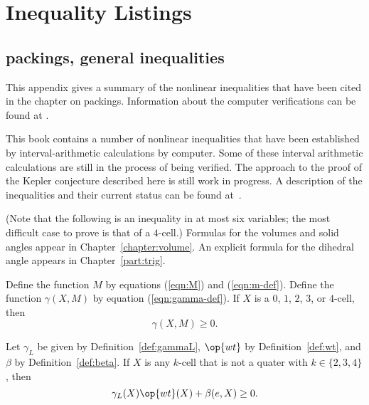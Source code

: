 \clearpage

\section{Inequality Listings}


\subsection{packings, general inequalities}

This appendix gives a summary of the nonlinear inequalities that have
been cited in the chapter on packings.  Information about the computer
verifications can be found at \cite{hales:2009:nonlinear}.


\begin{note}%
This book contains a number of nonlinear inequalities that have been
established by interval-arithmetic calculations by computer.  Some
of these interval arithmetic calculations are still in the process
of being verified.  The approach to the proof of the Kepler
conjecture described here is still work in progress.  A description
of the inequalities and their current status can be found
at~\cite{hales:2009:nonlinear}.
\end{note}


(Note that the following is an inequality in at most six variables; the most
difficult case to prove is that of a $4$-cell.)  Formulas for the
volumes and solid angles appear in Chapter~\ref{chapter:volume}.  An
explicit formula for the dihedral angle appears in
Chapter~\ref{part:trig}.


\begin{calculation}\label{calc:marchal}
Define the function $M$ by equations (\ref{eqn:M}) and
(\ref{eqn:m-def}).  Define the function $\gamma(X,M)$ by equation
(\ref{eqn:gamma-def}).  If $X$ is a $0$, $1$, $2$, $3$, or $4$-cell,
then
\begin{displaymath}
\gamma(X,M)\ge 0.
\end{displaymath}
\end{calculation}

\begin{calculation}\label{calc:cc:qtr}
Let $\gamma_L$ be given by Definition~\ref{def:gammaL}, $\op{wt}$ by
Definition~\ref{def:wt}, and $\beta$ by Definition~\ref{def:beta}.
If $X$ is any $k$-cell that is not a quater with $k\in\{2,3,4\}$,
then %
\begin{displaymath}
\gamma_L(X) \op{wt}(X) + \beta(e,X)\ge 0.
\end{displaymath} 
\end{calculation}

